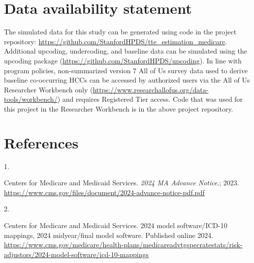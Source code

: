 \documentclass[
  12pt,
  number]{elsarticle}
\newlength{\cslhangindent}
\newlength{\csllabelwidth}
\newenvironment{CSLReferences}[2] %
 {\begin{list}{}{%
  \setlength{\itemindent}{0pt}
  \setlength{\leftmargin}{0pt}
  \setlength{\parsep}{0pt}
  \ifodd #1
   \setlength{\leftmargin}{\cslhangindent}
   \setlength{\itemindent}{-1\cslhangindent}
  \fi
  \setlength{\itemsep}{#2\baselineskip}}}
 {\end{list}}
\newcommand{\CSLLeftMargin}[1]{\parbox[t]{\csllabelwidth}{\strut#1\strut}}
\newcommand{\CSLRightInline}[1]{\parbox[t]{\linewidth - \csllabelwidth}{\strut#1\strut}}
\begin{document}
\section{Data availability statement}\label{data-availability-statement}

The simulated data for this study can be generated using code in the
project repository:
\url{https://github.com/StanfordHPDS/tte_estimation_medicare}.
Additional upcoding, undercoding, and baseline data can be simulated
using the upcoding package
(\url{https://github.com/StanfordHPDS/upcoding}). In line with program
policies, non-summarized version 7 All of Us survey data used to derive
baseline co-occurring HCCs can be accessed by authorized users via the
All of Us Researcher Workbench only
(\url{https://www.researchallofus.org/data-tools/workbench/}) and
requires Registered Tier access. Code that was used for this project in
the Researcher Workbench is in the above project repository.

\section*{References}\label{references}

\label{refs}
\begin{CSLReferences}{0}{1}
\CSLLeftMargin{1. }%
\CSLRightInline{Centers for Medicare and Medicaid Services. \emph{2024
{MA} Advance Notice}.; 2023.
\url{https://www.cms.gov/files/document/2024-advance-notice-pdf.pdf}}

\CSLLeftMargin{2. }%
\CSLRightInline{Centers for Medicare and Medicaid Services. 2024 model
software/{ICD}-10 mappings, 2024 midyear/final model software. Published
online 2024.
\url{https://www.cms.gov/medicare/health-plans/medicareadvtgspecratestats/risk-adjustors/2024-model-software/icd-10-mappings}}

\end{CSLReferences}
\end{document}

